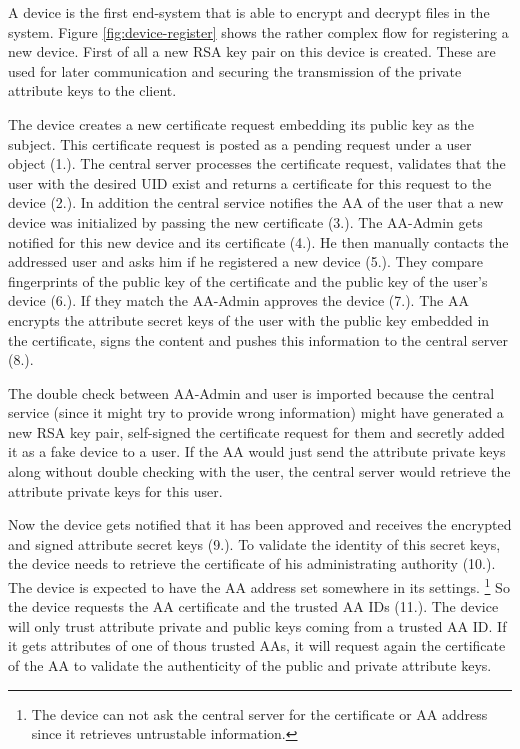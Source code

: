 A device is the first end-system that is able to encrypt and decrypt files in the system. Figure \ref{fig:device-register} shows the rather complex flow for registering a new device. First of all a new RSA key pair on this device is created. These are used for later communication and securing the transmission of the private attribute keys to the client. 

The device creates a new certificate request embedding its public key as the subject. This certificate request is posted as a pending request under a user object (1.). The central server processes the certificate request, validates that the user with the desired UID exist and returns a certificate for this request to the device (2.). In addition the central service notifies the AA of the user that a new device was initialized by passing the new certificate (3.). The AA-Admin gets notified for this new device and its certificate (4.). He then manually contacts the addressed user and asks him if he registered a new device (5.). They compare fingerprints of the public key of the certificate and the public key of the user’s device (6.). If they match the AA-Admin approves the device (7.). The AA encrypts the attribute secret keys of the user with the public key embedded in the certificate, signs the content and pushes this information to the central server (8.). 

The double check between AA-Admin and user is imported because the central service (since it might try to provide wrong information) might have generated a new RSA key pair, self-signed the certificate request for them and secretly added it as a fake device to a user. If the AA would just send the attribute private keys along without double checking with the user, the central server would retrieve the attribute private keys for this user. 

Now the device gets notified that it has been approved and receives the encrypted and signed attribute secret keys (9.). To validate the identity of this secret keys, the device needs to retrieve the certificate of his administrating authority (10.). The device is expected to have the AA address set somewhere in its settings. \footnote{The device can not ask the central server for the certificate or AA address since it retrieves untrustable information.} So the device requests the AA certificate and the trusted AA IDs (11.). The device will only trust attribute private and public keys coming from a trusted AA ID. If it gets attributes of one of thous trusted AAs, it will request again the certificate of the AA to validate the authenticity of the public and private attribute keys. 

